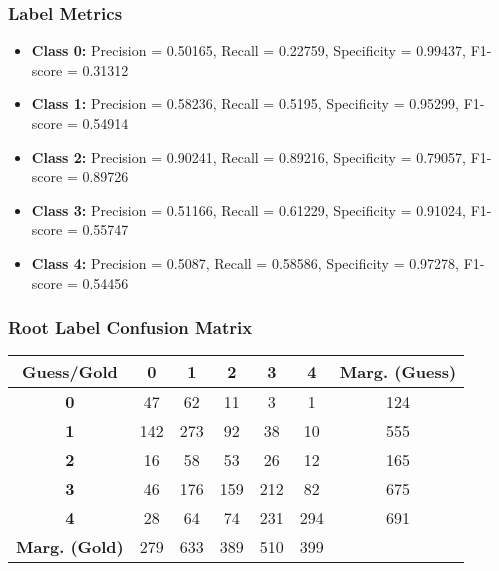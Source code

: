 \subsubsection{Label Metrics}
\begin{itemize}
	\item \textbf{Class 0:} Precision = 0.50165, Recall = 0.22759, Specificity = 0.99437, F1-score = 0.31312
	\item \textbf{Class 1:} Precision = 0.58236, Recall = 0.5195,  Specificity = 0.95299, F1-score = 0.54914
	\item \textbf{Class 2:} Precision = 0.90241, Recall = 0.89216, Specificity = 0.79057, F1-score = 0.89726
	\item \textbf{Class 3:} Precision = 0.51166, Recall = 0.61229, Specificity = 0.91024, F1-score = 0.55747
	\item \textbf{Class 4:} Precision = 0.5087,  Recall = 0.58586, Specificity = 0.97278, F1-score = 0.54456
\end{itemize}

\subsubsection{Root Label Confusion Matrix}
\begin{table}[h]
	\centering
	\begin{tabular}{c|ccccc|c}
		\textbf{Guess/Gold}   & \textbf{0} & \textbf{1} & \textbf{2} & \textbf{3} & \textbf{4} & \textbf{Marg. (Guess)} \\
		\hline
		\textbf{0}            & 47         & 62         & 11         & 3          & 1          & 124                    \\
		\textbf{1}            & 142        & 273        & 92         & 38         & 10         & 555                    \\
		\textbf{2}            & 16         & 58         & 53         & 26         & 12         & 165                    \\
		\textbf{3}            & 46         & 176        & 159        & 212        & 82         & 675                    \\
		\textbf{4}            & 28         & 64         & 74         & 231        & 294        & 691                    \\
		\hline
		\textbf{Marg. (Gold)} & 279        & 633        & 389        & 510        & 399        &                        \\
	\end{tabular}
\end{table}

